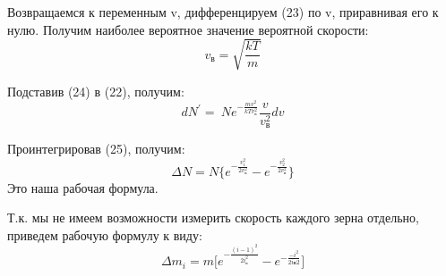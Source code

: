 \documentclass[a4paper,12pt]{article}
\begin{document}
Возвращаемся к переменным v, дифференцируем (23) по v, приравнивая его к нулю. Получим наиболее вероятное значение вероятной скорости:
\begin{equation}
v_в=\sqrt{\frac{kT}{m}}
\end{equation}

Подставив (24) в (22), получим:
\begin{equation}
dN^\prime=\ Ne^{-\frac{mv^2}{kTv_в^2}}\frac{v}{v_в^2}dv 
\end{equation}

Проинтегрировав (25), получим:
\begin{equation}
\Delta N=N\bigg\{e^{-\frac{v_1^2}{2v_в^2}}- e^{-\frac{v_2^2}{2v_в^2}} \bigg\}     
\end{equation}
Это наша рабочая формула.

Т.к. мы не имеем возможности измерить скорость каждого зерна отдельно, приведем рабочую формулу к виду:
\begin{equation}
\Delta m_i=m\bigg[e^{-\frac{(i-1)^2}{2i_в^2}}- e^{-\frac{-i^2}{2iв2}}\bigg]
\end{equation}
\end{document}
